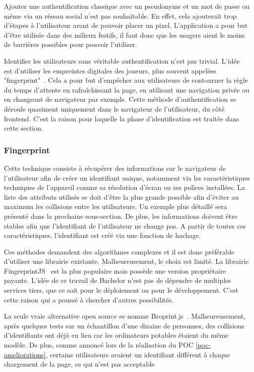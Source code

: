 Ajouter une authentification classique avec un pseudonyme et un mot de passe ou même via un réseau social n'est pas souhaitable. En effet, cela ajouterait trop d'étapes à l'utilisateur avant de pouvoir placer un pixel. L'application a pour but d'être utilisée dans des milieux festifs, il faut donc que les usagers aient le moins de barrières possibles pour pouvoir l'utiliser.

Identifier les utilisateurs sans véritable authentification n'est pas trivial. L'idée est d'utiliser les empreintes digitales des joueurs, plus souvent appelées "fingerprint"~\cite{devicefingerprint}. Cela a pour but d'empêcher aux utilisateurs de contourner la règle du temps d'attente en rafraîchissant la page, en utilisant une navigation privée ou en changeant de navigateur par exemple. Cette méthode d'authentification se déroule quasiment uniquement dans le navigateur de l'utilisateur, du côté frontend. C'est la raison pour laquelle la phase d'identification est traitée dans cette section.

\subsubsection{Fingerprint}

Cette technique consiste à récupérer des informations sur le navigateur de l'utilisateur afin de créer un identifiant unique, notamment via les caractéristiques techniques de l'appareil comme sa résolution d'écran ou ses polices installées. La liste des attributs utilisés se doit d'être la plus grande possible afin d'éviter au maximum les collisions entre les utilisateurs. Un exemple plus détaillé sera présenté dans la prochaine sous-section. De plus, les informations doivent être stables afin que l'identifiant de l'utilisateur ne change pas. A partir de toutes ces caractéristiques, l'identifiant est créé via une fonction de hachage.

Ces méthodes demandent des algorithmes complexes et il est donc préférable d'utiliser une librairie existante. Malheureusement, le choix est limité. La librairie FingerprintJS~\cite{fingerprintjs} est la plus populaire mais possède une version propriétaire payante. L'idée de ce travail de Bachelor n'est pas de dépendre de multiples services tiers, que ce soit pour le déploiement ou pour le développement. C'est cette raison qui a poussé à chercher d'autres possibilités.

La seule vraie alternative open source se nomme Broprint.js~\cite{broprintjs}. Malheureusement, après quelques tests sur un échantillon d'une dizaine de personnes, des collisions d'identifiants ont déjà eu lieu car les ordinateurs potables étaient du même modèle. De plus, comme annoncé lors de la réalisation du POC \ref{poc-ameliorations}, certains utilisateurs avaient un identifiant différent à chaque chargement de la page, ce qui n'est pas acceptable

